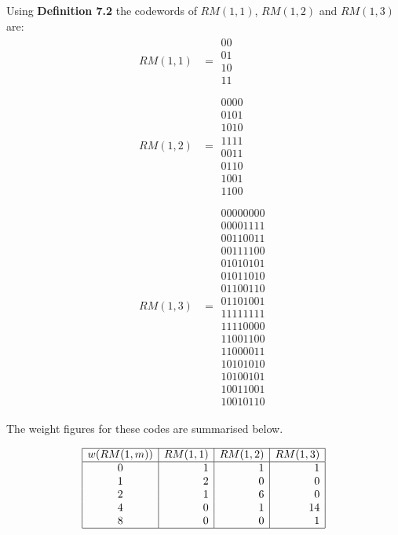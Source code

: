 Using \textbf{Definition 7.2} the codewords of $RM(1,1)$, $RM(1,2)$ and $RM(1,3)$ are:
\begin{align*}
RM(1,1) &= \begin{array}{c}
00 \\ 
01 \\ 
10 \\ 
11
\end{array}\\\\
RM(1,2) &= \begin{array}{c}
0000 \\ 
0101 \\ 
1010 \\ 
1111 \\ 
0011 \\ 
0110 \\ 
1001 \\ 
1100
\end{array}\\\\
RM(1,3) &=
\begin{array}{c}
   0   0   0   0   0   0   0   0\\
   0   0   0   0   1   1   1   1\\
   0   0   1   1   0   0   1   1\\
   0   0   1   1   1   1   0   0\\
   0   1   0   1   0   1   0   1\\
   0   1   0   1   1   0   1   0\\
   0   1   1   0   0   1   1   0\\
   0   1   1   0   1   0   0   1\\
   1   1   1   1   1   1   1   1\\
   1   1   1   1   0   0   0   0\\
   1   1   0   0   1   1   0   0\\
   1   1   0   0   0   0   1   1\\
   1   0   1   0   1   0   1   0\\
   1   0   1   0   0   1   0   1\\
   1   0   0   1   1   0   0   1\\
   1   0   0   1   0   1   1   0
\end{array}
\end{align*}
\begin{comment}
$RM(1,1)$ has 1 codeword of weight 0; 2 codewords of weight 1 and 1 codeword of weight 2.

$RM(1,2)$ has 1 codeword of weight 0; 6 codewords of weight 2 and 1 codeword of weight 4.

$RM(1,3)$ has 1 codeword of weight 0; 14 codewords of weight 4 and 1 codeword of weight 8.
\end{comment}
The weight figures for these codes are summarised below.

\[
	\begin{array}{|c|r|r|r|}\hline
	w(RM(1,m)) & RM(1,1) & RM(1,2) & RM(1,3) \\ \hline
	0 & 1 & 1 & 1 \\ 
	1 & 2 & 0 & 0 \\ 
	2 & 1 & 6 & 0 \\ 
	4 & 0 & 1 & 14 \\ 
	8 & 0 & 0 & 1\\ \hline
	\end{array}
\]



